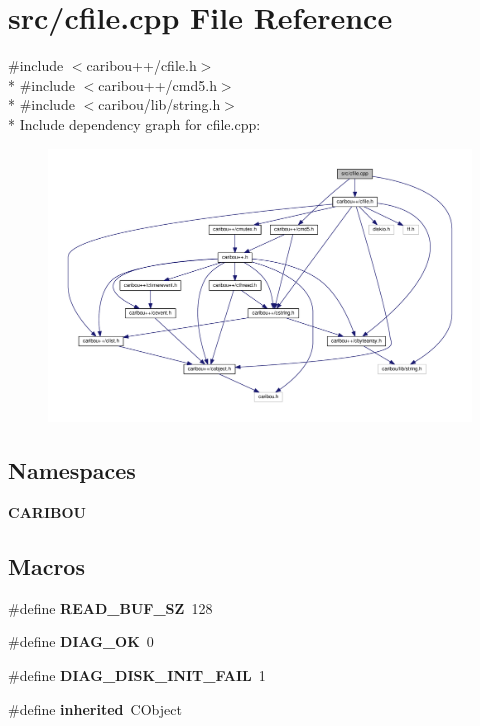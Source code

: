 \section{src/cfile.cpp File Reference}
\label{cfile_8cpp}
{\ttfamily \#include $<$caribou++/cfile.\-h$>$}\\*
{\ttfamily \#include $<$caribou++/cmd5.\-h$>$}\\*
{\ttfamily \#include $<$caribou/lib/string.\-h$>$}\\*
Include dependency graph for cfile.\-cpp\-:\nopagebreak
\begin{figure}[H]
\begin{center}
\leavevmode
\includegraphics[width=350pt]{cfile_8cpp__incl}
\end{center}
\end{figure}
\subsection*{Namespaces}
\begin{DoxyCompactItemize}
\item 
{\bf C\-A\-R\-I\-B\-O\-U}
\end{DoxyCompactItemize}
\subsection*{Macros}
\begin{DoxyCompactItemize}
\item 
\#define {\bf R\-E\-A\-D\-\_\-\-B\-U\-F\-\_\-\-S\-Z}~128
\item 
\#define {\bf D\-I\-A\-G\-\_\-\-O\-K}~0
\item 
\#define {\bf D\-I\-A\-G\-\_\-\-D\-I\-S\-K\-\_\-\-I\-N\-I\-T\-\_\-\-F\-A\-I\-L}~1
\item 
\#define {\bf inherited}~C\-Object
\end{DoxyCompactItemize}
